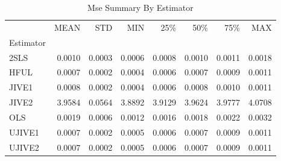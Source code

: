 \begin{table}[ht]
\centering
\caption{Mse Summary By Estimator}
\begin{tabular}{lrrrrrrr}
\toprule
 & MEAN & STD & MIN & 25\% & 50\% & 75\% & MAX \\
Estimator &  &  &  &  &  &  &  \\
\midrule
2SLS & 0.0010 & 0.0003 & 0.0006 & 0.0008 & 0.0010 & 0.0011 & 0.0018 \\
HFUL & 0.0007 & 0.0002 & 0.0004 & 0.0006 & 0.0007 & 0.0009 & 0.0011 \\
JIVE1 & 0.0008 & 0.0002 & 0.0004 & 0.0006 & 0.0008 & 0.0010 & 0.0011 \\
JIVE2 & 3.9584 & 0.0564 & 3.8892 & 3.9129 & 3.9624 & 3.9777 & 4.0708 \\
OLS & 0.0019 & 0.0006 & 0.0012 & 0.0016 & 0.0018 & 0.0022 & 0.0032 \\
UJIVE1 & 0.0007 & 0.0002 & 0.0005 & 0.0006 & 0.0007 & 0.0009 & 0.0011 \\
UJIVE2 & 0.0007 & 0.0002 & 0.0005 & 0.0006 & 0.0007 & 0.0009 & 0.0011 \\
\bottomrule
\end{tabular}
\end{table}
